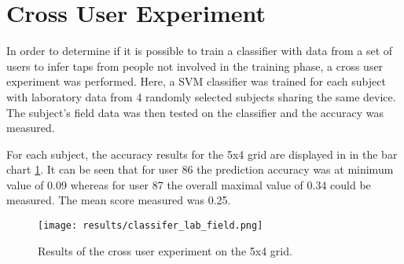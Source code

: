 \section{Cross User Experiment}
In order to determine if it is possible to train a classifier with data from a set of users to infer taps from people not involved in the training phase, a cross user experiment was performed. Here, a SVM classifier was trained for each subject with laboratory data from 4 randomly selected subjects sharing the same device. The subject's field data was then tested on the classifier and the accuracy was measured.

For each subject, the accuracy results for the 5x4 grid are displayed in in the bar chart \ref{fig:cross_user_exp}. It can be seen that for user 86 the prediction accuracy was at minimum value of 0.09 whereas for user 87 the overall maximal value of 0.34 could be measured. The mean score measured was 0.25.


\begin{figure}[h!]
  \centering
  \texttt{[image: results/classifer\_lab\_field.png]}
  \caption{Results of the cross user experiment on the 5x4 grid.} \label{fig:cross_user_exp}
\end{figure}


